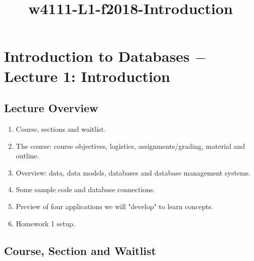 \documentclass[11pt]{article}
\title{w4111-L1-f2018-Introduction}
\providecommand{\tightlist}{%
      \setlength{\itemsep}{0pt}\setlength{\parskip}{0pt}}
\begin{document}
    
    
    \maketitle
    
    

    
    \section{\texorpdfstring{Introduction to Databases \(-\) Lecture 1:
Introduction}{Introduction to Databases - Lecture 1: Introduction}}\label{introduction-to-databases---lecture-1-introduction}

    \subsection{Lecture Overview}\label{lecture-overview}

\begin{enumerate}
\def\labelenumi{\arabic{enumi}.}
\tightlist
\item
  Course, sections and waitlist.
\item
  The course: course objectives, logistics, assignments/grading,
  material and outline.
\item
  Overview: data, data models, databases and database management
  systems.
\item
  Some sample code and database connections.
\item
  Preview of four applications we will "develop" to learn concepts.
\item
  Homework 1 setup.
\end{enumerate}

    \subsection{Course, Section and
Waitlist}\label{course-section-and-waitlist}
\end{document}
